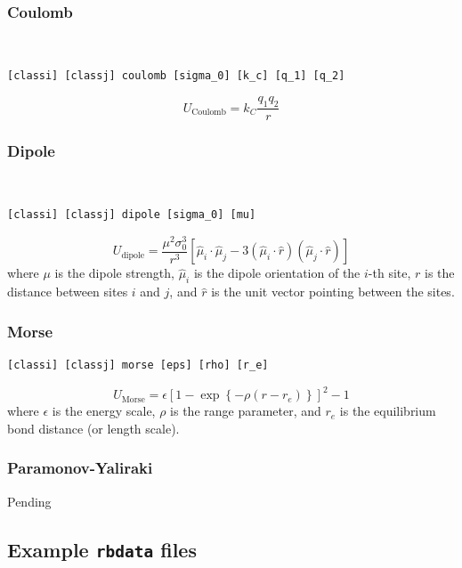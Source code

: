 \documentclass[12pt,a4paper,dvips]{article}
\begin{document}
\subsubsection{Coulomb}
{\tt
\begin{verbatim}
[classi] [classj] coulomb [sigma_0] [k_c] [q_1] [q_2]
\end{verbatim}
}
\begin{equation}
    U_{\mathrm{Coulomb}} = k_C \frac{q_1 q_2}{r}
\end{equation}

\subsubsection{Dipole}
{\tt
\begin{verbatim}
[classi] [classj] dipole [sigma_0] [mu]
\end{verbatim}
}
\begin{equation}
    U_{\mathrm{dipole}} = \frac{\mu^2 \sigma_0^3}{r^3} \left[ \hat{\mu}_i \cdot \hat{\mu}_j - 3\left(\hat{\mu}_i \cdot \hat{r}\right)\left(\hat{\mu}_j \cdot \hat{r}\right)\right]
\end{equation}
where $\mu$ is the dipole strength, $\hat{\mu}_i$ is the dipole orientation of the $i$-th site, $r$ is the distance between sites $i$ and $j$, and $\hat{r}$ is the unit vector pointing between the sites.

\subsubsection{Morse}
\begin{verbatim}
[classi] [classj] morse [eps] [rho] [r_e]
\end{verbatim}
\begin{equation}
    U_{\mathrm{Morse}} = \epsilon \left[1 - \exp\left\{ -\rho \left(r - r_e\right) \right\} \right]^2 - 1
\end{equation}
where $\epsilon$ is the energy scale, $\rho$ is the range parameter, and $r_e$ is the equilibrium bond distance (or length scale).

\subsubsection{Paramonov-Yaliraki}
Pending

\subsection{Example {\tt rbdata} files}
\end{document}
